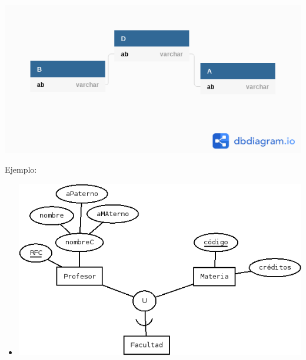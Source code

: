 \documentclass[12pt, letterpaper]{article}
\begin{document}
\begin{itemize}
\begin{itemize}
                          \begin{center}
                            \includegraphics[scale=0.5]{d2.png}
                          \end{center}

                      \end{itemize}

                      Ejemplo:

                      \begin{itemize}
                          \item

                          \begin{center}
                            \includegraphics[scale=0.5]{cate1.png}
                          \end{center}


\end{itemize}
\end{itemize}
\end{document}
